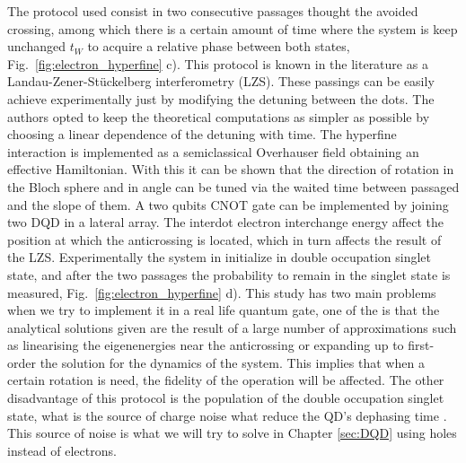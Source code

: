 The protocol used consist in two consecutive passages thought the avoided crossing, among which there is a certain amount of time where the system is keep unchanged $t_W$ to acquire a relative phase between both states, Fig.~\ref{fig:electron_hyperfine} c). This protocol is known in the literature as a Landau-Zener-Stückelberg interferometry \cite{Shevchenko2010} (LZS). These passings can be easily achieve experimentally just by modifying the detuning between the dots. The authors opted to keep the theoretical computations as simpler as possible by choosing a linear dependence of the detuning with time. The hyperfine interaction is implemented as a semiclassical Overhauser field obtaining an effective Hamiltonian. With this it can be shown that the direction of rotation in the Bloch sphere and in angle can be tuned via the waited time between passaged and the slope of them. A two qubits CNOT gate can be implemented by joining two DQD in a lateral array. The interdot electron interchange energy affect the position at which the anticrossing is located, which in turn affects the result of the LZS. Experimentally the system in initialize in double occupation singlet state, and after the two passages the probability to remain in the singlet state is measured, Fig.~\ref{fig:electron_hyperfine} d). This study has two main problems when we try to implement it in a real life quantum gate, one of the is that the analytical solutions given are the result of a large number of approximations such as linearising the eigenenergies near the anticrossing or expanding up to first-order the solution for the dynamics of the system. This implies that when a certain rotation is need, the fidelity of the operation will be affected. The other disadvantage of this protocol is the population of the double occupation singlet state, what is the source of charge noise what reduce the QD's dephasing time \cite{Kuhlmann2013,Fujisawa2000}. This source of noise is what we will try to solve in Chapter \ref{sec:DQD} using holes instead of electrons.


